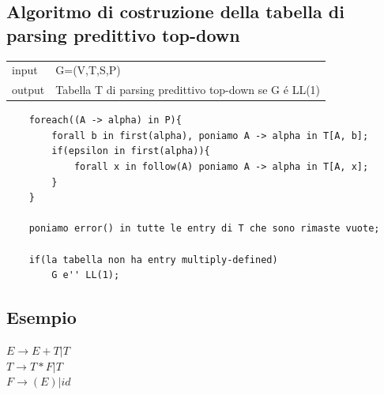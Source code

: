 \subsection{Algoritmo di costruzione della tabella di parsing predittivo top-down}

\begin{center}
    \begin{tabular}{ll}
        input   &   G=(V,T,S,P) \\
        output  &   Tabella T di parsing predittivo top-down se G \'e LL(1)\\
    \end{tabular}
\end{center}

\begin{lstlisting}
    foreach((A -> alpha) in P){
        forall b in first(alpha), poniamo A -> alpha in T[A, b];
        if(epsilon in first(alpha)){
            forall x in follow(A) poniamo A -> alpha in T[A, x];
        }
    }
    
    poniamo error() in tutte le entry di T che sono rimaste vuote;

    if(la tabella non ha entry multiply-defined)
        G e'' LL(1);

\end{lstlisting}

\subsection{Esempio}

$E \rightarrow E+T|T $\\
$T \rightarrow T*F|T $\\
$F \rightarrow (E)|id $\\

